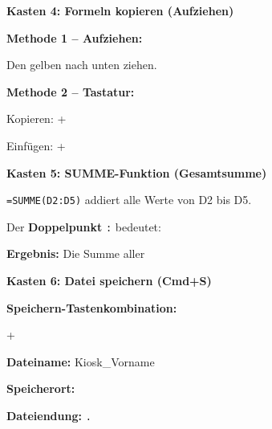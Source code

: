 \documentclass[11pt, a4paper]{article}
\newcommand{\luecke}[1]{\underline{\hspace{#1}}}
\begin{document}
\begin{multicols}{2}

\textbf{\textcolor{fachfarbe}{Kasten 4: Formeln kopieren (Aufziehen)}}

\begin{lueckenkasten}
\textbf{Methode 1 – Aufziehen:}

Den gelben \luecke{2cm} nach unten ziehen.

\vspace{0.2em}
\textbf{Methode 2 – Tastatur:}

Kopieren: \luecke{1.5cm} + \luecke{1cm}

Einfügen: \luecke{1.5cm} + \luecke{1cm}
\end{lueckenkasten}

\columnbreak


\textbf{\textcolor{fachfarbe}{Kasten 5: SUMME-Funktion (Gesamtsumme)}}

\begin{lueckenkasten}
\texttt{=SUMME(D2:D5)} addiert alle Werte von D2 bis D5.

\vspace{0.2em}
Der \textbf{Doppelpunkt} \texttt{:} bedeutet: \luecke{2cm}

\vspace{0.2em}
\textbf{Ergebnis:} Die Summe aller \luecke{3cm}
\end{lueckenkasten}


\textbf{\textcolor{fachfarbe}{Kasten 6: Datei speichern (Cmd+S)}}

\begin{lueckenkasten}
\textbf{Speichern-Tastenkombination:}

\luecke{1.5cm} + \luecke{1cm}

\vspace{0.2em}
\textbf{Dateiname:} Kiosk\_Vorname

\textbf{Speicherort:} \luecke{3cm}

\textbf{Dateiendung:} \texttt{.}\luecke{2cm}
\end{lueckenkasten}


\end{multicols}
\end{document}
